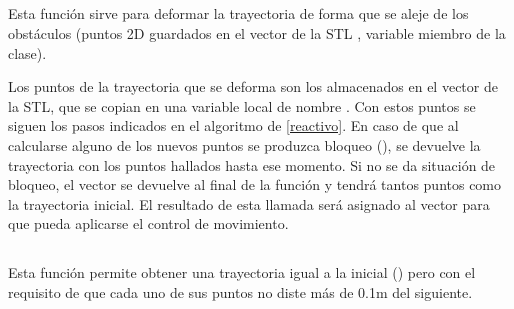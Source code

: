 \subsection{}

\noindent
{}

\noindent
Esta función sirve para deformar la trayectoria de forma que se aleje de los obstáculos (puntos 2D guardados en el vector de la STL , variable miembro de la clase).

\noindent
Los puntos de la trayectoria que se deforma son los almacenados en el vector  de la STL, que se copian en una variable local de nombre . Con estos puntos se siguen los pasos indicados en el algoritmo de \ref{reactivo}. En caso de que al calcularse alguno de los nuevos puntos se produzca bloqueo (), se devuelve la trayectoria  con los puntos hallados hasta ese momento. Si no se da situación de bloqueo, el vector  se devuelve al final de la función y tendrá tantos puntos como la trayectoria inicial. El resultado de esta llamada será asignado al vector  para que pueda aplicarse el control de movimiento.

%
%
%

\subsection{}

\noindent
{}

\noindent
Esta función permite obtener una trayectoria igual a la inicial () pero con el requisito de que cada uno de sus puntos no diste más de 0.1m del siguiente.


